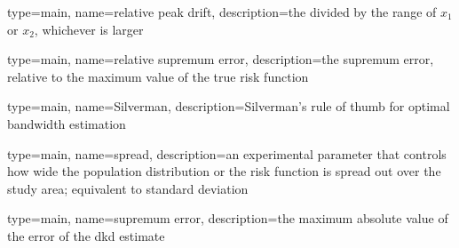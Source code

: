 {%
   type=main,
   name={relative peak drift},
   description={the  divided by the range of \ensuremath{x_1} or \ensuremath{x_2}, whichever is larger}
}

{%
   type=main,
   name={relative supremum error},
   description={the supremum error, relative to the maximum value of the true risk function}
}

{
   type=main,
   name={Silverman},
   description={Silverman's rule of thumb for optimal bandwidth estimation}
}

{
   type=main,
   name={spread},
   description={an experimental parameter that controls how wide the population distribution or the risk function is spread out over the study area; equivalent to standard deviation}
}

{%
   type=main,
   name={supremum error},
   description={the maximum absolute value of the error of the dkd estimate}
}


